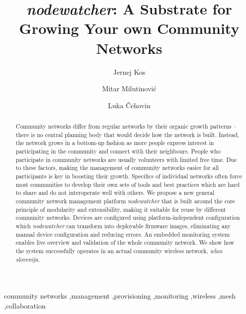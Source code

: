 \documentclass[5p,sort&compress]{elsarticle}
\newcommand{\nodewatcher}{\textit{nodewatcher}}
\newcommand{\wlanslovenija}{\textit{wlan slovenija}}
\begin{document}
\begin{frontmatter}
\title{\nodewatcher{}: A Substrate for Growing Your own Community Networks}

\author[fri,wlansi]{Jernej Kos}

\author[berkeley,wlansi]{Mitar Milutinović}

\author[fri,wlansi]{Luka Čehovin}


\address[fri]{University of Ljubljana, Faculty of Computer and Information Science, Ljubljana, Slovenia}

\address[berkeley]{University of California, Berkeley, USA}

\address[wlansi]{\wlanslovenija{}, Open wireless network of Slovenia, \url{https://wlan-si.net}}

\begin{abstract}
Community networks differ from regular networks by their organic growth patterns -- there is no central planning body that would decide how the network is built.
Instead, the network grows in a bottom-up fashion as more people express interest in participating in the community and connect with their neighbours.
People who participate in community networks are usually volunteers with limited free time.
Due to these factors, making the management of community networks easier for all participants is key in boosting their growth.
Specifics of individual networks often force most communities to develop their own sets of tools and best practices which are hard to share and do not interoperate well with others.
We propose a new general community network management platform \nodewatcher{} that is built around the core principle of modularity and extensibility, making it suitable for reuse by different community networks.
Devices are configured using platform-independent configuration which \nodewatcher{} can transform into deployable firmware images, eliminating any manual device configuration and reducing errors.
An embedded monitoring system enables live overview and validation of the whole community network.
We show how the system successfully operates in an actual community wireless network, \wlanslovenija{}.
\end{abstract}

\begin{keyword}
community networks \sep management \sep provisioning \sep monitoring \sep wireless \sep mesh \sep collaboration
\end{keyword}
\end{frontmatter}
\end{document}

